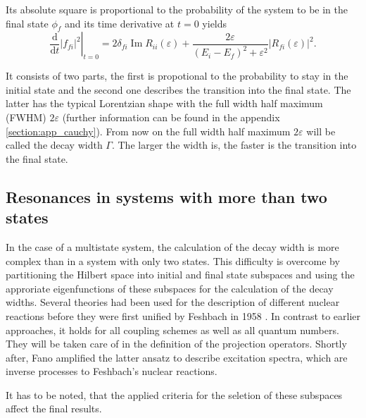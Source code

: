 Its absolute square is proportional to the probability of the system to be
in the final state $\phi_f$ and its time derivative at $t=0$ yields
\begin{equation}
  \left . \frac{\mathrm{d}}{\mathrm{d}t} |f_{fi}|^2 \right |_{t=0}
  = 2\delta_{fi} \operatorname{Im}R_{ii}(\varepsilon) 
    + \frac{2\varepsilon}{(E_i-E_f)^2+\varepsilon^2} |R_{fi}(\varepsilon)|^2 .
\end{equation}

It consists of two parts, the first is propotional to the probability to stay
in the initial state and the second one describes the transition into the
final state. The latter has the typical Lorentzian shape with the full width
half maximum
(FWHM) $2 \varepsilon$ (further information can be found in the appendix
\ref{section:app_cauchy}). From now on
the full width half maximum ${2\varepsilon}$ will be called the
decay width $\Gamma$.
The larger the width is, the faster is the transition into the final state.





\subsection{Resonances in systems with more than two states}

In the case of a multistate system, the calculation of the decay width is more
complex than in a system with only two states.
This difficulty is overcome by partitioning the Hilbert space into initial and final
state subspaces and using the approriate eigenfunctions of these subspaces for the
calculation of the decay widths. 
Several theories had been used for the description of different nuclear reactions
before they were first unified by Feshbach in 1958 \cite{Feshbach58,Feshbach62,Feshbach_book}.
In contrast to earlier approaches, it holds for all coupling schemes as well as
all quantum numbers. They will be taken care of in the definition of the
projection operators.
Shortly after,
Fano amplified the latter ansatz to describe excitation spectra, which
are inverse processes to Feshbach's nuclear reactions.\cite{Fano61}

It has to be noted, that the applied criteria for the seletion of
these subspaces affect the final results.

